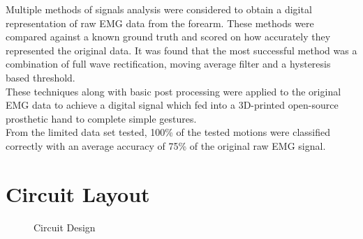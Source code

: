 \documentclass[12pt,openany,a4paper]{book}
\begin{document}
Multiple methods of signals analysis were considered to obtain a digital representation of raw EMG data from the forearm. These methods were  compared against a known ground truth and scored on how accurately they represented the original data. It was found that the most successful method was a combination of full wave rectification, moving average filter and a hysteresis based threshold.\\

These techniques along with basic post processing were applied to the original EMG data to achieve a digital signal which fed into a 3D-printed open-source prosthetic hand to complete simple gestures.\\

From the limited data set tested, 100\% of the tested motions were classified correctly with an average accuracy of 75\% of the original raw EMG signal.  

\cleardoublepage

\tableofcontents

\listoffigures
{}

\listoftables
{}


\makeglossaries
\printglossaries


\cleardoublepage



\mainmatter
\setlength{\parindent}{0cm}















\appendix
\newpage
{}
\mbox{}
\newpage


\chapter{Circuit Layout}\label{app:circuit}
\begin{figure}[!ht]
\centering
\caption{Circuit Design}
\label{fig: Circuit Design}
\end{figure}

\end{document}

